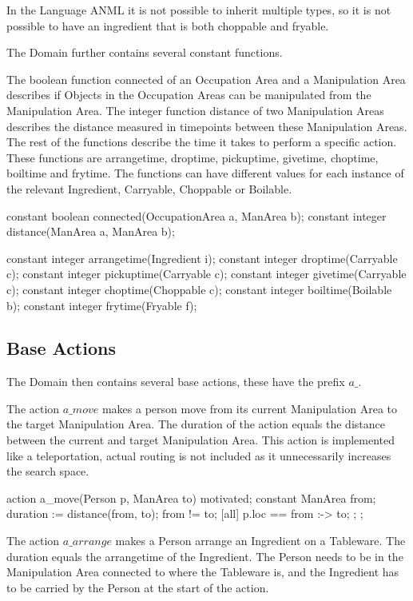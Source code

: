 In the Language ANML it is not possible to inherit multiple types, so it is not possible to have an ingredient that is both choppable and fryable.

The Domain further contains several constant functions.

The boolean function connected of an Occupation Area and a Manipulation Area describes if Objects in the Occupation Areas can be manipulated from the Manipulation Area.
The integer function distance of two Manipulation Areas describes the distance measured in timepoints between these Manipulation Areas.
The rest of the functions describe the time it takes to perform a specific action.
These functions are arrangetime, droptime, pickuptime, givetime, choptime, boiltime and frytime.
The functions can have different values for each instance of the relevant Ingredient, Carryable, Choppable or Boilable.

\begin{anmlcode}
constant boolean connected(OccupationArea a, ManArea b);
constant integer distance(ManArea a, ManArea b);

constant integer arrangetime(Ingredient i);
constant integer droptime(Carryable c);
constant integer pickuptime(Carryable c);
constant integer givetime(Carryable c);
constant integer choptime(Choppable c);
constant integer boiltime(Boilable b);
constant integer frytime(Fryable f);
\end{anmlcode}


\subsection{Base Actions}
The Domain then contains several base actions, these have the prefix $a\_$.

The action $a\_move$ makes a person move from its current Manipulation Area to the target Manipulation Area.
The duration of the action equals the distance between the current and target Manipulation Area.
This action is implemented like a teleportation, actual routing is not included as it unnecessarily increases the search space.

\begin{anmlcode}
action a_move(Person p, ManArea to) {
  motivated;
  constant ManArea from;
  duration := distance(from, to);
  from != to;
  [all] {
    p.loc == from :-> to;
  };
};
\end{anmlcode}

The action $a\_arrange$ makes a Person arrange an Ingredient on a Tableware.
The duration equals the arrangetime of the Ingredient.
The Person needs to be in the Manipulation Area connected to where the Tableware is, and the Ingredient has to be carried by the Person at the start of the action.

